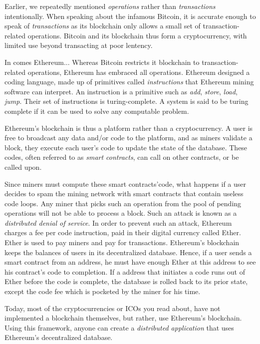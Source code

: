 Earlier, we repeatedly mentioned \emph{operations} rather than \emph{transactions} intentionally.
When speaking about the infamous Bitcoin, it is accurate enough to speak of \emph{transactions} as its blockchain
only allows a small set of transaction-related operations.
Bitcoin and its blockchain thus form a cryptocurrency, with limited use beyond transacting at poor lentency.

In comes Ethereum...
Whereas Bitcoin restricts it blockchain to transaction-related operations, Ethereum has embraced all operations.
Ethereum designed a coding language, made up of primitives called \emph{instructions} that Ethereum mining software can interpret.
An instruction is a primitive such as \emph{add}, \emph{store}, \emph{load}, \emph{jump}. 
Their set of instructions is turing-complete.
A system is said to be turing complete if it can be used to solve any computable problem.

Ethereum's blockchain is thus a platform rather than a cryptocurrency.
A user is free to broadcast any data and/or code to the platform, and as miners validate a block,
they execute each user's code to update the state of the database.
These codes, often referred to as \emph{smart contracts}, can call on other contracts, or be called upon.

Since miners must compute these smart contracts'code, what happens if a user decides to spam the mining network with
smart contracts that contain useless code loops. 
Any miner that picks such an operation from the pool of pending operations will not be able to process a block.
Such an attack is known as a \emph{distributed denial of service}.
In order to prevent such an attack, Ethereum charges a fee per code instruction, paid in their digital currency called Ether.
Ether is used to pay miners and pay for transactions.
Ethereum's blockchain keeps the balances of users in its decentralized database.
Hence, if a user sends a smart contract from an address, he must have enough Ether at this address to see his contract's code
to completion.
If a address that initiates a code runs out of Ether before the code is complete, the database is rolled back to its prior
state, except the code fee which is pocketed by the miner for his time.

Today, most of the cryptocurrencies or ICOs you read about, have not implemented a blockchain themselves,
but rather, use Ethereum's blockchain.
Using this framework, anyone can create a \emph{distributed application} that uses Ethereum's decentralized database.

